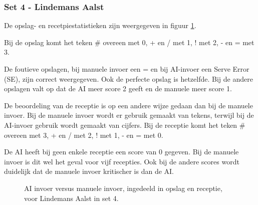 \subsubsection{Set 4 - Lindemans Aalst}
\label{sec:PL3_Aalst4}
De opslag- en recetpiestatistieken zijn weergegeven in figuur \ref{fig:PL3ServeReceiveAalst4}. 

Bij de opslag komt het teken \# overeen met 0, + en / met 1, ! met 2, - en = met 3.

De foutieve opslagen, bij manuele invoer een = en bij AI-invoer een Serve Error (SE), zijn correct weergegeven.  Ook de perfecte opslag is hetzelfde. Bij de andere opslagen valt op dat de AI meer score 2 geeft en de manuele meer score 1.

De beoordeling van de receptie is op een andere wijze gedaan dan bij de manuele invoer. Bij de manuele invoer wordt er gebruik gemaakt van tekens, terwijl bij de AI-invoer gebruik wordt gemaakt van cijfers. Bij de receptie komt het teken \# overeen met 3, + en / met 2, ! met 1, - en = met 0.

De AI heeft bij geen enkele receptie een score van 0 gegeven. Bij de manuele invoer is dit wel het geval voor vijf recepties. Ook bij de andere scores wordt duidelijk dat de manuele invoer kritischer is dan de AI.

\begin{figure}[ht]
\centering
{}
\caption{AI invoer versus manuele invoer, ingedeeld in opslag en receptie, voor Lindemans Aalst in set 4.}
\label{fig:PL3ServeReceiveAalst4}
\end{figure}

